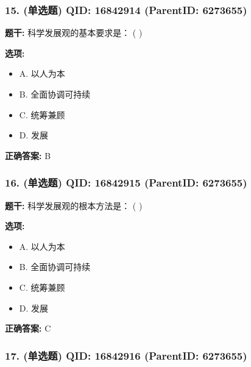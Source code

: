 \documentclass[12pt,UTF8]{ctexart}
\begin{document}
\subsubsection*{15. (单选题) \small QID: 16842914 (ParentID: 6273655)}

\textbf{题干:}
科学发展观的基本要求是： ( )



\textbf{选项:}
\begin{itemize}[leftmargin=*]

  \item A. 以人为本

  \item B. 全面协调可持续

  \item C. 统筹兼顾

  \item D. 发展

\end{itemize}

\textbf{正确答案:}
B

\vspace{0.3em}\hrulefill\vspace{0.7em}

\subsubsection*{16. (单选题) \small QID: 16842915 (ParentID: 6273655)}

\textbf{题干:}
科学发展观的根本方法是： ( )



\textbf{选项:}
\begin{itemize}[leftmargin=*]

  \item A. 以人为本

  \item B. 全面协调可持续

  \item C. 统筹兼顾

  \item D. 发展

\end{itemize}

\textbf{正确答案:}
C

\vspace{0.3em}\hrulefill\vspace{0.7em}

\subsubsection*{17. (单选题) \small QID: 16842916 (ParentID: 6273655)}
\end{document}
